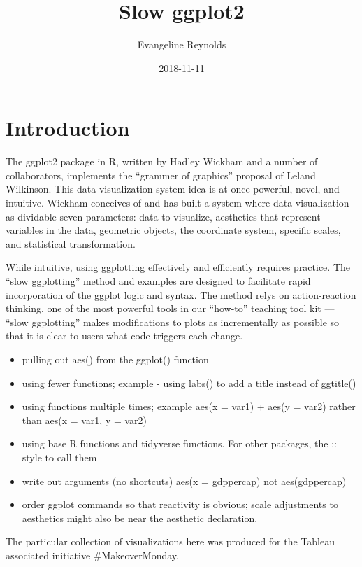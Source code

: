 \documentclass[]{book}
\title{Slow ggplot2}
\author{Evangeline Reynolds}
\date{2018-11-11}
\providecommand{\tightlist}{%
  \setlength{\itemsep}{0pt}\setlength{\parskip}{0pt}}
\theoremstyle{definition}
\theoremstyle{definition}
\theoremstyle{definition}
\theoremstyle{remark}
\begin{document}
\maketitle

{
\setcounter{tocdepth}{1}
\tableofcontents
}
\chapter{Introduction}\label{intro}

The ggplot2 package in R, written by Hadley Wickham and a number of
collaborators, implements the ``grammer of graphics'' proposal of Leland
Wilkinson. This data visualization system idea is at once powerful,
novel, and intuitive. Wickham conceives of and has built a system where
data visualization as dividable seven parameters: data to visualize,
aesthetics that represent variables in the data, geometric objects, the
coordinate system, specific scales, and statistical transformation.

While intuitive, using ggplotting effectively and efficiently requires
practice. The ``slow ggplotting'' method and examples are designed to
facilitate rapid incorporation of the ggplot logic and syntax. The
method relys on action-reaction thinking, one of the most powerful tools
in our ``how-to'' teaching tool kit --- ``slow ggplotting'' makes
modifications to plots as incrementally as possible so that it is clear
to users what code triggers each change.

\begin{itemize}
\tightlist
\item
  pulling out aes() from the ggplot() function
\item
  using fewer functions; example - using labs() to add a title instead
  of ggtitle()
\item
  using functions multiple times; example aes(x = var1) + aes(y = var2)
  rather than aes(x = var1, y = var2)
\item
  using base R functions and tidyverse functions. For other packages,
  the :: style to call them
\item
  write out arguments (no shortcuts) aes(x = gdppercap) not
  aes(gdppercap)
\item
  order ggplot commands so that reactivity is obvious; scale adjustments
  to aesthetics might also be near the aesthetic declaration.
\end{itemize}

The particular collection of visualizations here was produced for the
Tableau associated initiative \#MakeoverMonday.
\end{document}
